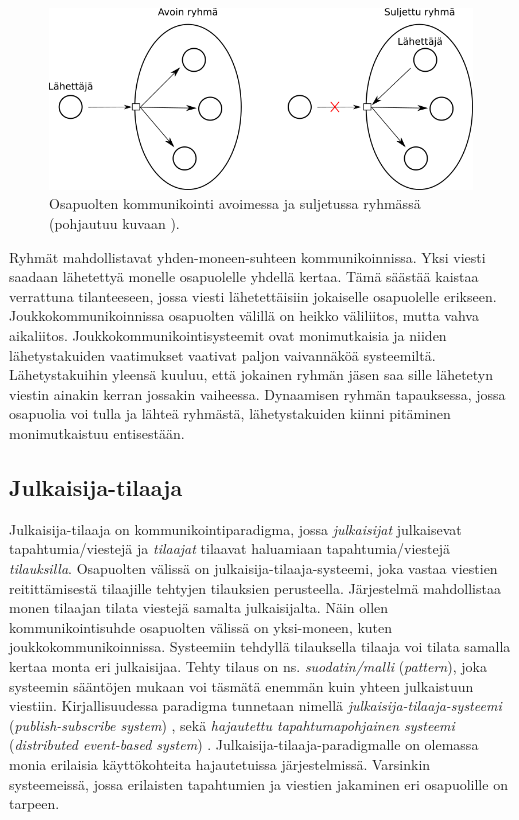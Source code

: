 \begin{figure}[ht!]
	\includegraphics[width=1\textwidth]{pictures/group-communication.png}
	\caption{Osapuolten kommunikointi avoimessa ja suljetussa ryhmässä (pohjautuu kuvaan \mbox{\cite[s.~235]{distributed-systems-concepts-and-design}}).}
	\label{fig:group-communication}
\end{figure}

Ryhmät mahdollistavat yhden-moneen-suhteen kommunikoinnissa. Yksi viesti saadaan lähetettyä monelle osapuolelle yhdellä kertaa. Tämä säästää kaistaa verrattuna tilanteeseen, jossa viesti lähetettäisiin jokaiselle osapuolelle erikseen. Joukkokommunikoinnissa osapuolten välillä on heikko väliliitos, mutta vahva aikaliitos. Joukkokommunikointisysteemit ovat monimutkaisia ja niiden lähetystakuiden vaatimukset vaativat paljon vaivannäköä systeemiltä. Lähetystakuihin yleensä kuuluu, että jokainen ryhmän jäsen saa sille lähetetyn viestin ainakin kerran jossakin vaiheessa. Dynaamisen ryhmän tapauksessa, jossa osapuolia voi tulla ja lähteä ryhmästä, lähetystakuiden kiinni pitäminen monimutkaistuu entisestään. \mbox{\cite{group-communication-specification}} \mbox{\cite[s.~236]{distributed-systems-concepts-and-design}}


\subsection{Julkaisija-tilaaja}
\label{ch:julkaisija-tilaaja-paradigma}
Julkaisija-tilaaja on kommunikointiparadigma, jossa \emph{julkaisijat} julkaisevat tapahtumia/viestejä ja \emph{tilaajat} tilaavat haluamiaan tapahtumia/viestejä \emph{tilauksilla}. Osapuolten välissä on julkaisija-tilaaja-systeemi, joka vastaa viestien reitittämisestä tilaajille tehtyjen tilauksien perusteella. Järjestelmä mahdollistaa monen tilaajan tilata viestejä samalta julkaisijalta. Näin ollen kommunikointisuhde osapuolten välissä on yksi-moneen, kuten joukkokommunikoinnissa. Systeemiin tehdyllä tilauksella tilaaja voi tilata samalla kertaa monta eri julkaisijaa. Tehty tilaus on ns. \emph{suodatin/malli} (\emph{pattern}), joka systeemin sääntöjen mukaan voi täsmätä enemmän kuin yhteen julkaistuun viestiin. Kirjallisuudessa paradigma tunnetaan nimellä \emph{julkaisija-tilaaja-systeemi} (\emph{publish-subscribe system}) \cite{baldoni2005distributed}, sekä \emph{hajautettu tapahtumapohjainen systeemi} (\emph{distributed event-based system}) \cite{distributed-event-based-systems}. Julkaisija-tilaaja-paradigmalle on olemassa monia erilaisia käyttökohteita hajautetuissa järjestelmissä. Varsinkin systeemeissä, jossa erilaisten tapahtumien ja viestien jakaminen eri osapuolille on tarpeen.

